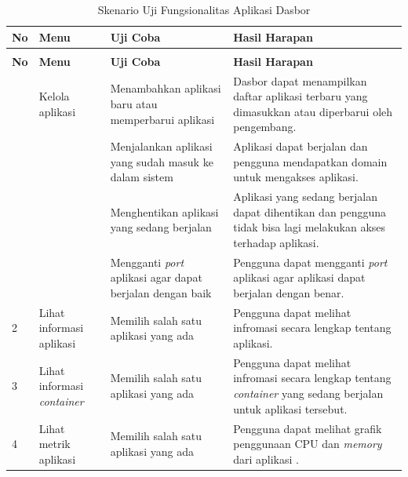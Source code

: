            \begin{longtable}{|p{}|p{}|p{}|p{}|}
						\caption{Skenario Uji Fungsionalitas Aplikasi Dasbor} \label{skenarioUjiDasboard} \\
						\hline
						\textbf{No} & \textbf{Menu} & \textbf{Uji Coba} & \textbf{Hasil Harapan} \\ \hline
						\endfirsthead
						\caption[]{Skenario Uji Fungsionalitas Aplikasi Dasbor}  \\
						\hline
						\textbf{No} & \textbf{Menu} & \textbf{Uji Coba} & \textbf{Hasil Harapan} \\ \hline
						\endhead
						\endfoot
						\endlastfoot
						1 & Kelola aplikasi & Menambahkan aplikasi baru atau memperbarui aplikasi & Dasbor dapat menampilkan daftar aplikasi terbaru yang dimasukkan atau diperbarui oleh pengembang. \\ \cline{3-4}
                        && Menjalankan aplikasi yang sudah masuk ke dalam sistem & Aplikasi dapat berjalan dan pengguna mendapatkan domain untuk mengakses aplikasi. \\ \cline{3-4}
                        && Menghentikan aplikasi yang sedang berjalan & Aplikasi yang sedang berjalan dapat dihentikan dan pengguna tidak bisa lagi melakukan akses terhadap aplikasi. \\ \cline{3-4}
                        && Mengganti \textit{port} aplikasi agar dapat berjalan dengan baik & Pengguna dapat mengganti \textit{port} aplikasi agar aplikasi dapat berjalan dengan benar. \\ \hline
						2 & Lihat informasi aplikasi & Memilih salah satu aplikasi yang ada  & Pengguna dapat melihat infromasi secara lengkap tentang aplikasi. \\ \hline
                        3 & Lihat informasi \textit{container} & Memilih salah satu aplikasi yang ada  & Pengguna dapat melihat infromasi secara lengkap tentang \textit{container} yang sedang berjalan untuk aplikasi tersebut. \\ \hline
                        4 & Lihat metrik aplikasi & Memilih salah satu aplikasi yang ada  & Pengguna dapat melihat grafik penggunaan CPU dan \textit{memory} dari aplikasi . \\ \hline
					\end{longtable}
        
